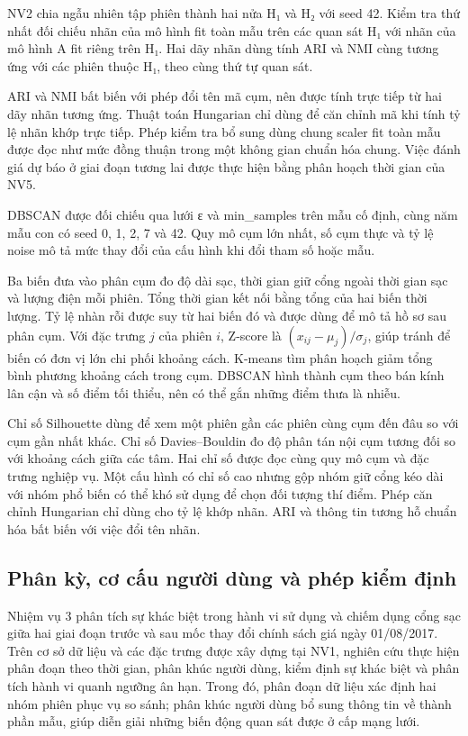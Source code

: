 \documentclass[conference,a4paper]{IEEEtran}
\begin{document}
NV2 chia ngẫu nhiên tập phiên thành hai nửa H₁ và H₂ với seed 42. Kiểm tra thứ nhất đối chiếu nhãn của mô hình fit toàn mẫu trên các quan sát H₁ với nhãn của mô hình A fit riêng trên H₁. Hai dãy nhãn dùng tính ARI và NMI cùng tương ứng với các phiên thuộc H₁, theo cùng thứ tự quan sát.

ARI và NMI bất biến với phép đổi tên mã cụm, nên được tính trực tiếp từ hai dãy nhãn tương ứng. Thuật toán Hungarian chỉ dùng để căn chỉnh mã khi tính tỷ lệ nhãn khớp trực tiếp. Phép kiểm tra bổ sung dùng chung scaler fit toàn mẫu được đọc như mức đồng thuận trong một không gian chuẩn hóa chung. Việc đánh giá dự báo ở giai đoạn tương lai được thực hiện bằng phân hoạch thời gian của NV5.

DBSCAN được đối chiếu qua lưới ε và min\_samples trên mẫu cố định, cùng năm mẫu con có seed 0, 1, 2, 7 và 42. Quy mô cụm lớn nhất, số cụm thực và tỷ lệ noise mô tả mức thay đổi của cấu hình khi đổi tham số hoặc mẫu.

Ba biến đưa vào phân cụm đo độ dài sạc, thời gian giữ cổng ngoài thời gian sạc và lượng điện mỗi phiên. Tổng thời gian kết nối bằng tổng của hai biến thời lượng. Tỷ lệ nhàn rỗi được suy từ hai biến đó và được dùng để mô tả hồ sơ sau phân cụm. Với đặc trưng $j$ của phiên $i$, Z-score là $(x_{ij}-\mu_j)/\sigma_j$, giúp tránh để biến có đơn vị lớn chi phối khoảng cách. K-means tìm phân hoạch giảm tổng bình phương khoảng cách trong cụm. DBSCAN hình thành cụm theo bán kính lân cận và số điểm tối thiểu, nên có thể gắn những điểm thưa là nhiễu.

Chỉ số Silhouette dùng để xem một phiên gần các phiên cùng cụm đến đâu so với cụm gần nhất khác. Chỉ số Davies--Bouldin đo độ phân tán nội cụm tương đối so với khoảng cách giữa các tâm. Hai chỉ số \cite{rousseeuw1987,davies1979} được đọc cùng quy mô cụm và đặc trưng nghiệp vụ. Một cấu hình có chỉ số cao nhưng gộp nhóm giữ cổng kéo dài với nhóm phổ biến có thể khó sử dụng để chọn đối tượng thí điểm. Phép căn chỉnh Hungarian chỉ dùng cho tỷ lệ khớp nhãn. ARI và thông tin tương hỗ chuẩn hóa bất biến với việc đổi tên nhãn.


\subsection{Phân kỳ, cơ cấu người dùng và phép kiểm định}

Nhiệm vụ 3 phân tích sự khác biệt trong hành vi sử dụng và chiếm dụng cổng sạc giữa hai giai đoạn trước và sau mốc thay đổi chính sách giá ngày 01/08/2017. Trên cơ sở dữ liệu và các đặc trưng được xây dựng tại NV1, nghiên cứu thực hiện phân đoạn theo thời gian, phân khúc người dùng, kiểm định sự khác biệt và phân tích hành vi quanh ngưỡng ân hạn. Trong đó, phân đoạn dữ liệu xác định hai nhóm phiên phục vụ so sánh; phân khúc người dùng bổ sung thông tin về thành phần mẫu, giúp diễn giải những biến động quan sát được ở cấp mạng lưới.
\end{document}
